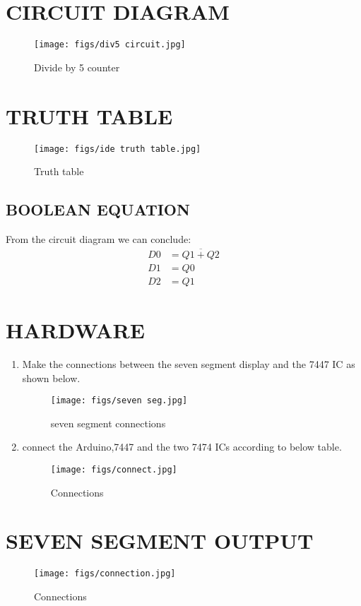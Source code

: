 \documentclass[journal,12pt,twocolumn]{IEEEtran}
\begin{document}
\section{CIRCUIT DIAGRAM}
\begin{figure}[H]
\centering
\texttt{[image: figs/div5 circuit.jpg]}
\caption{Divide by 5 counter}
\label{fig:div5 circuit.jpg}
\end{figure}

\section{TRUTH TABLE}
\begin{figure}[H]
\centering
\texttt{[image: figs/ide truth table.jpg]}
\caption{Truth table}
\label{fig:ide truth table.jpg}
\end{figure}

\subsection{BOOLEAN EQUATION}
From the circuit diagram we can conclude:
\begin{align}
	D0 &=\overline{Q1 + Q2}\\
	D1 &= Q0\\
	D2 &= Q1
\end{align}

\section{HARDWARE}
\begin{enumerate}
\item Make the connections between the seven segment display and the 7447 IC as shown below.
	\begin{figure}[H]
		\centering
		\texttt{[image: figs/seven seg.jpg]}
		\caption{seven segment connections}
		\label{fig:seven seg.jpg}
	\end{figure}
\item connect the Arduino,7447 and the two 7474 ICs according to below table.
	\begin{figure}[h!]
		\centering
		\texttt{[image: figs/connect.jpg]}
		\caption{Connections}
		\label{fig:connect.jpg}
	\end{figure}


\end{enumerate}
\section{SEVEN SEGMENT OUTPUT}
\begin{figure}[H]
\centering
\texttt{[image: figs/connection.jpg]}
\caption{Connections}
\label{fig:connection.jpg}
\end{figure}
\end{document}
